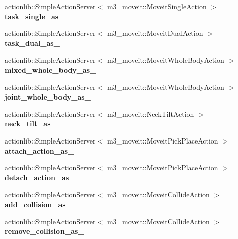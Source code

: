 \begin{DoxyCompactItemize}
actionlib\+::\+Simple\+Action\+Server$<$ m3\+\_\+moveit\+::\+Moveit\+Single\+Action $>$ {\bfseries task\+\_\+single\+\_\+as\+\_\+}
\item 
\mbox{\label{classM3MoveGroup_a147f3ffea79b2cc41b0d1dd56eb351fc}} 
actionlib\+::\+Simple\+Action\+Server$<$ m3\+\_\+moveit\+::\+Moveit\+Dual\+Action $>$ {\bfseries task\+\_\+dual\+\_\+as\+\_\+}
\item 
\mbox{\label{classM3MoveGroup_a1d3fb944130d30f0b67ae0f43a44f015}} 
actionlib\+::\+Simple\+Action\+Server$<$ m3\+\_\+moveit\+::\+Moveit\+Whole\+Body\+Action $>$ {\bfseries mixed\+\_\+whole\+\_\+body\+\_\+as\+\_\+}
\item 
\mbox{\label{classM3MoveGroup_a6178e9c498cb85202da04878c6348814}} 
actionlib\+::\+Simple\+Action\+Server$<$ m3\+\_\+moveit\+::\+Moveit\+Whole\+Body\+Action $>$ {\bfseries joint\+\_\+whole\+\_\+body\+\_\+as\+\_\+}
\item 
\mbox{\label{classM3MoveGroup_aba54e6c86c7547a1d8ab018a8abcb435}} 
actionlib\+::\+Simple\+Action\+Server$<$ m3\+\_\+moveit\+::\+Neck\+Tilt\+Action $>$ {\bfseries neck\+\_\+tilt\+\_\+as\+\_\+}
\item 
\mbox{\label{classM3MoveGroup_a89e363644f1da3c9ea6a7f366407be6b}} 
actionlib\+::\+Simple\+Action\+Server$<$ m3\+\_\+moveit\+::\+Moveit\+Pick\+Place\+Action $>$ {\bfseries attach\+\_\+action\+\_\+as\+\_\+}
\item 
\mbox{\label{classM3MoveGroup_aa0f9fa4a773acb86ffdc5eccd02e9620}} 
actionlib\+::\+Simple\+Action\+Server$<$ m3\+\_\+moveit\+::\+Moveit\+Pick\+Place\+Action $>$ {\bfseries detach\+\_\+action\+\_\+as\+\_\+}
\item 
\mbox{\label{classM3MoveGroup_a7f7e0ce3ab9874af9ceb4ac0d0ed918c}} 
actionlib\+::\+Simple\+Action\+Server$<$ m3\+\_\+moveit\+::\+Moveit\+Collide\+Action $>$ {\bfseries add\+\_\+collision\+\_\+as\+\_\+}
\item 
\mbox{\label{classM3MoveGroup_a9123cb84f6c5c07b3f23423ca5350446}} 
actionlib\+::\+Simple\+Action\+Server$<$ m3\+\_\+moveit\+::\+Moveit\+Collide\+Action $>$ {\bfseries remove\+\_\+collision\+\_\+as\+\_\+}

\end{DoxyCompactItemize}
